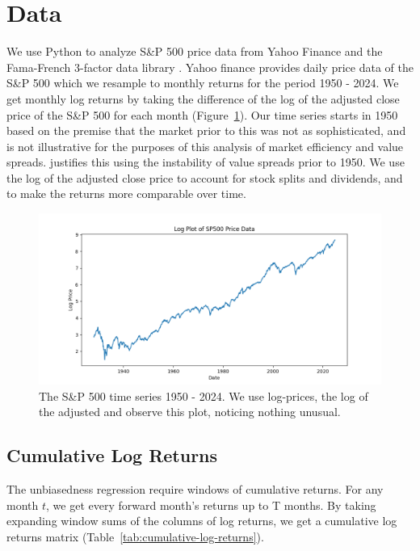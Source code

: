 \section{Data}
\label{sec:data}

We use Python \citep{python3} to analyze S\&P 500 price data from Yahoo Finance \citep{yahoo_finance_gspc} and the Fama-French 3-factor data library \citep{french_website}.
Yahoo finance provides daily price data of the S\&P 500 which we resample to monthly returns for the period 1950 - 2024. We get monthly log returns by taking the
difference of the log of the adjusted close price of the S\&P 500 for each month (Figure~\ref{fig:sp500-returns}). Our time series starts in 1950
based on the premise that the market prior to this was not as sophisticated, and is not illustrative for the purposes of this analysis of market efficiency and value spreads. \citep{asness_2024} justifies this using the 
instability of value spreads prior to 1950. We use the log of the adjusted close price to account for stock splits and dividends, and to make the returns more comparable over time.

\begin{figure}[h!]
    \centering
    \includegraphics[width=1\textwidth]{../figs/SP500 Log Price.png}
    \caption{The S\&P 500 time series 1950 - 2024. We use log-prices, the log of the adjusted and observe this plot, noticing nothing unusual.}
    \label{fig:sp500-returns}
\end{figure}

\subsection{Cumulative Log Returns}

The unbiasedness regression require windows of cumulative returns. For any month $t$, we get every forward month's returns up to T months.
By taking expanding window sums of the columns of log returns, we get a cumulative log returns matrix (Table~\ref{tab:cumulative-log-returns}).

